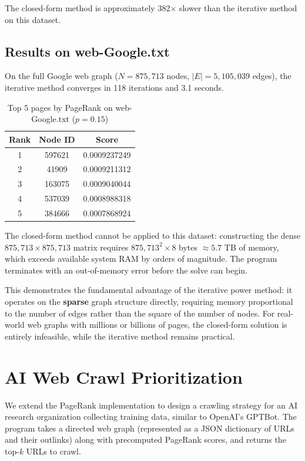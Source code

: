 \documentclass{article}
\begin{document}
The closed-form method is approximately 382$\times$ slower than the iterative method on this dataset.

\subsection{Results on web-Google.txt}

On the full Google web graph ($N = 875{,}713$ nodes, $|E| = 5{,}105{,}039$ edges), the iterative method converges in 118 iterations and 3.1 seconds.

\begin{table}[h]
\centering
\begin{tabular}{|c|c|c|}
\hline
\textbf{Rank} & \textbf{Node ID} & \textbf{Score} \\
\hline
1 & 597621 & 0.0009237249 \\
2 & 41909  & 0.0009211312 \\
3 & 163075 & 0.0009040044 \\
4 & 537039 & 0.0008988318 \\
5 & 384666 & 0.0007868924 \\
\hline
\end{tabular}
\caption{Top 5 pages by PageRank on web-Google.txt ($p = 0.15$)}
\end{table}

The closed-form method cannot be applied to this dataset: constructing the dense $875{,}713 \times 875{,}713$ matrix requires $875{,}713^2 \times 8$ bytes $\approx 5.7$ TB of memory, which exceeds available system RAM by orders of magnitude. The program terminates with an out-of-memory error before the solve can begin.

This demonstrates the fundamental advantage of the iterative power method: it operates on the \textbf{sparse} graph structure directly, requiring memory proportional to the number of edges rather than the square of the number of nodes. For real-world web graphs with millions or billions of pages, the closed-form solution is entirely infeasible, while the iterative method remains practical.

\section{AI Web Crawl Prioritization}

We extend the PageRank implementation to design a crawling strategy for an AI research organization collecting training data, similar to OpenAI's GPTBot. The program takes a directed web graph (represented as a JSON dictionary of URLs and their outlinks) along with precomputed PageRank scores, and returns the top-$k$ URLs to crawl.
\end{document}
